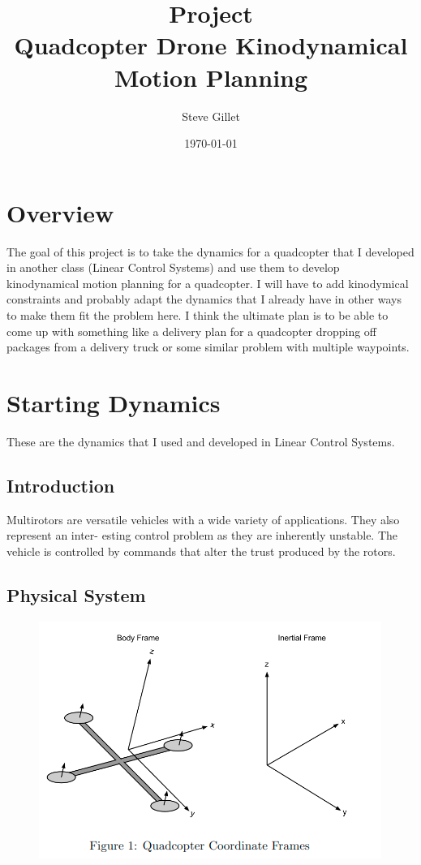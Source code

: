 \documentclass{article}
\title{Project \\ \large Quadcopter Drone Kinodynamical Motion Planning}
\author{Steve Gillet}
\date{\today}
\begin{document}
\maketitle

\section*{Overview}
The goal of this project is to take the dynamics for a quadcopter that I developed in another class (Linear Control Systems) and use them to develop kinodynamical motion planning for a quadcopter.
I will have to add kinodymical constraints and probably adapt the dynamics that I already have in other ways to make them fit the problem here.
I think the ultimate plan is to be able to come up with something like a delivery plan for a quadcopter dropping off packages from a delivery truck or some similar problem with multiple waypoints.

\section*{Starting Dynamics}

These are the dynamics that I used and developed in Linear Control Systems.

\subsection*{Introduction}

Multirotors are versatile vehicles with a wide variety of applications. They also represent an inter-
esting control problem as they are inherently unstable. The vehicle is controlled by commands that
alter the trust produced by the rotors.

\subsection*{Physical System}
  
\begin{figure}[H]    
    \centering
    \includegraphics[width=0.6\linewidth]{quadcopterFrameFigure.png}
\end{figure}
\end{document}
